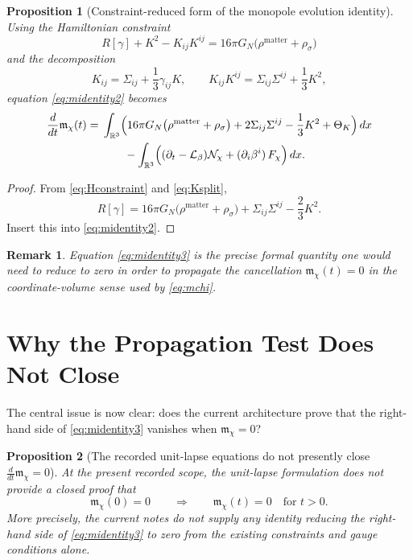 \documentclass[11pt]{article}
\newcommand{\Ell}{\mathcal{L}}
\newtheorem{proposition}{Proposition}
\newtheorem{remark}{Remark}
\begin{document}
\begin{proposition}[Constraint-reduced form of the monopole evolution identity]
\label{prop:mconstraint}
Using the Hamiltonian constraint
\begin{equation}
R[\gamma]+K^2-K_{ij}K^{ij}
=
16\pi G_N\bigl(\rho^{\mathrm{matter}}+\rho_\sigma\bigr)
\label{eq:Hconstraint}
\end{equation}
and the decomposition
\begin{equation}
K_{ij}=\Sigma_{ij}+\frac{1}{3}\gamma_{ij}K,
\qquad
K_{ij}K^{ij}=\Sigma_{ij}\Sigma^{ij}+\frac{1}{3}K^2,
\label{eq:Ksplit}
\end{equation}
equation \eqref{eq:midentity2} becomes
\begin{align}
\frac{d}{dt}\mathfrak m_\chi(t)
=\;&
\int_{\mathbb R^3}
\Bigl(
16\pi G_N\bigl(\rho^{\mathrm{matter}}+\rho_\sigma\bigr)
+ 2\Sigma_{ij}\Sigma^{ij}
- \frac{1}{3}K^2
+ \Theta_K
\Bigr)\,dx
\nonumber\\
&\qquad
-\int_{\mathbb R^3}
\Bigl(
(\partial_t-\Ell_\beta)\mathcal N_\chi
+ (\partial_i\beta^i)\,F_\chi
\Bigr)\,dx.
\label{eq:midentity3}
\end{align}
\end{proposition}

\begin{proof}
From \eqref{eq:Hconstraint} and \eqref{eq:Ksplit},
\[
R[\gamma]
=
16\pi G_N\bigl(\rho^{\mathrm{matter}}+\rho_\sigma\bigr)
+ \Sigma_{ij}\Sigma^{ij}
- \frac{2}{3}K^2.
\]
Insert this into \eqref{eq:midentity2}.
\end{proof}

\begin{remark}
Equation \eqref{eq:midentity3} is the precise formal quantity one would need to reduce to zero in order to propagate the cancellation \(\mathfrak m_\chi(t)=0\) in the coordinate-volume sense used by \eqref{eq:mchi}.
\end{remark}

\section{Why the Propagation Test Does Not Close}

The central issue is now clear: does the current architecture prove that the right-hand side of \eqref{eq:midentity3} vanishes when \(\mathfrak m_\chi=0\)?

\begin{proposition}[The recorded unit-lapse equations do not presently close \(\frac{d}{dt}\mathfrak m_\chi=0\)]
\label{prop:propfail}
At the present recorded scope, the unit-lapse formulation does not provide a closed proof that
\begin{equation}
\mathfrak m_\chi(0)=0
\qquad\Longrightarrow\qquad
\mathfrak m_\chi(t)=0
\quad\text{for } t>0.
\label{eq:propgoal}
\end{equation}
More precisely, the current notes do not supply any identity reducing the right-hand side of \eqref{eq:midentity3} to zero from the existing constraints and gauge conditions alone.
\end{proposition}
\end{document}
